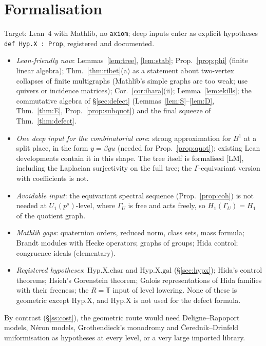 \documentclass[11pt]{amsart}
\theoremstyle{plain}
\theoremstyle{definition}
\theoremstyle{remark}
\newcommand{\T}{\mathbb{T}}\newcommand{\m}{\mathfrak{m}}\newcommand{\cT}{\mathcal{T}}\newcommand{\cX}{\mathcal{X}}
\begin{document}
\section{Formalisation}\label{sec:lean}
Target: Lean~4 with Mathlib, no \texttt{axiom}; deep inputs enter as explicit hypotheses \texttt{def Hyp.X : Prop}, registered and documented.
\begin{itemize}
\item \emph{Lean-friendly now}: Lemmas~\ref{lem:tree}, \ref{lem:stab}; Prop.~\ref{prop:phi} (finite linear algebra); Thm.~\ref{thm:ribet}(a) as a statement about two-vertex collapses of finite multigraphs (Mathlib's simple graphs are too weak; use quivers or incidence matrices); Cor.~\ref{cor:ihara}(ii); Lemma~\ref{lem:ekills}; the commutative algebra of \S\ref{sec:defect} (Lemmas~\ref{lem:S}--\ref{lem:D}, Thm.~\ref{thm:E}, Prop.~\ref{prop:subquot}) and the final squeeze of Thm.~\ref{thm:defect}.
\item \emph{One deep input for the combinatorial core}: strong approximation for $B^1$ at a split place, in the form $y=\beta gu$ (needed for Prop.~\ref{prop:quot}); existing Lean developments contain it in this shape. The tree itself is formalised [LM], including the Laplacian surjectivity on the full tree; the $\Gamma$-equivariant version with coefficients is not.
\item \emph{Avoidable input}: the equivariant spectral sequence (Prop.~\ref{prop:coh}) is not needed at $U_1(p^s)$-level, where $\Gamma_U$ is free and acts freely, so $H_1(\Gamma_U)=H_1$ of the quotient graph.
\item \emph{Mathlib gaps}: quaternion orders, reduced norm, class sets, mass formula; Brandt modules with Hecke operators; graphs of groups; Hida control; congruence ideals (elementary).
\item \emph{Registered hypotheses}: $\mathrm{Hyp.X.char}$ and $\mathrm{Hyp.X.gal}$ (\S\ref{sec:hypx}); Hida's control theorems; Hsieh's Gorenstein theorem; Galois representations of Hida families with their freeness; the $R=\T$ input of level lowering. None of these is geometric except $\mathrm{Hyp.X}$, and $\mathrm{Hyp.X}$ is not used for the defect formula.
\end{itemize}
By contrast (\S\ref{ss:cost}), the geometric route would need Deligne--Rapoport models, Néron models, Grothendieck's monodromy and Čerednik--Drinfeld uniformisation as hypotheses at every level, or a very large imported library.
\end{document}
